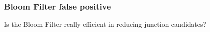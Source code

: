\begin{frame}
	\frametitle{Bloom Filter false positive}
	\centering
	
	  Is the Bloom Filter really efficient in reducing junction candidates?
	  
    \bigskip
	  
    
    

\end{frame}

